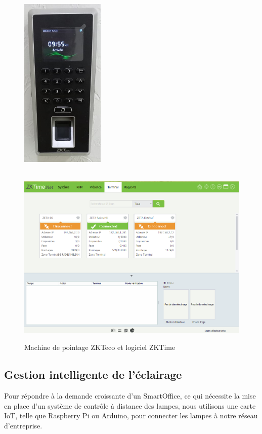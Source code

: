 \begin{figure}[H]
\centering
\includegraphics[height=10cm,width=4cm]{Images/BRades-Pointage.jpg}\includegraphics[width=12cm]{Images/ZKTime.png}
\caption{Machine de pointage ZKTeco et logiciel ZKTime}
\label{Chap4.2.5}
\end{figure}
\smallskip

\subsection{Gestion intelligente de l'éclairage}

Pour répondre à la demande croissante d'un SmartOffice, ce qui nécessite la mise en place d'un système de contrôle à distance des lampes, nous utilisons une carte IoT, telle que Raspberry Pi ou Arduino, pour connecter les lampes à notre réseau d'entreprise. 

